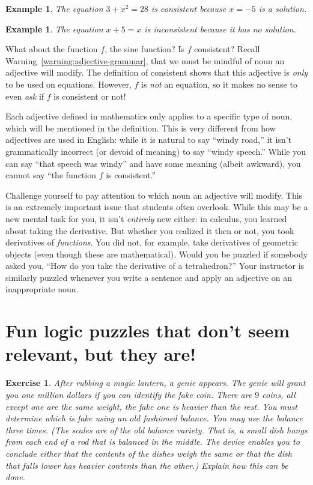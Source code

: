 \documentclass{book}
\newcounter{ekcounter}%
\theoremstyle{ekimcustom}
\newtheorem{example}[ekcounter]{Example}
\newtheorem{exercise}[ekcounter]{Exercise}
\begin{document}
\begin{example}
The equation $3+x^2=28$ is consistent because $x=-5$ is a solution.
\end{example}
\begin{example}
The equation $x+5=x$ is inconsistent because it has no solution.
\end{example}

What about the function $f$, the sine function? Is $f$ consistent? Recall Warning~\ref{warning:adjective-grammar}, that we must be mindful of noun an adjective will modify. The definition of consistent shows that this adjective is \emph{only} to be used on equations. However, $f$ is \emph{not} an equation, so it makes no sense to even \emph{ask} if $f$ is consistent or not!

Each adjective defined in mathematics only applies to a specific type of noun, which will be mentioned in the definition. This is very different from how adjectives are used in English: while it is natural to say ``windy road,'' it isn't grammatically incorrect (or devoid of meaning) to say ``windy speech.'' While you can say ``that speech was windy'' and have some meaning (albeit awkward), you cannot say ``the function $f$ is consistent.''

Challenge yourself to pay attention to which noun an adjective will modify. This is an extremely important issue that students often overlook. While this may be a new mental task for you, it isn't \emph{entirely} new either: in calculus, you learned about taking the derivative. But whether you realized it then or not, you took derivatives of \emph{functions}. You did not, for example, take derivatives of geometric objects (even though these are mathematical). Would you be puzzled if somebody asked you, ``How do you take the derivative of a tetrahedron?'' Your instructor is similarly puzzled whenever you write a sentence and apply an adjective on an inappropriate noun.

\section{Fun logic puzzles that don't seem relevant, but they are!}


\begin{exercise}
After rubbing a magic lantern, a genie appears. The genie will grant you one million dollars if you can identify the fake coin. There are $9$ coins, all except one are the same weight, the fake one is heavier than the rest. You must determine which is fake using an old fashioned balance. You may use the balance three times. (The scales are of the old balance variety. That is, a small dish hangs from each end of a rod that is balanced in the middle. The device enables you to conclude either that the contents of the dishes weigh the same or that the dish that falls lower has heavier contents than the other.) Explain how this can be done.
\end{exercise}
\end{document}
